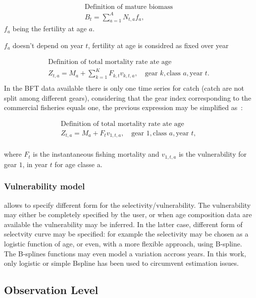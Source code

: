 \begin{gather}
\mbox{Definition of mature biomass}\\
B_t= \sum_{a=1}^A N_{t,a} f_a,
\end{gather} 
$f_a$ being the fertility at age $a$. 

$f_a$ doesn't depend  on year $t$, fertility at  age is considred
  as fixed over year

  
  
\begin{gather}
  \mbox{Definition of total mortality rate ate age}\\
  Z_{t,a}= M_a + \sum_{k=1}^K F_{k,t} v_{k, t,a}, \quad \mbox{gear }k,
  \mbox{class }a, \mbox{year }t.   \\
\end{gather} 
In  the  BFT  data  available  there is  only  one  time  series  for
 catch (catch are  not split among different  gears), considering that
 the gear index corresponding to the 
commercial fisheries equals one, the previous expression may be simplified as~:

\begin{gather}
  \mbox{Definition of total mortality rate ate age}\\
  Z_{t,a}= M_a + F_t v_{1, t,a}, \quad \mbox{gear } 1,
  \mbox{class }a, \mbox{year }t,   \\
\end{gather} 

where $F_t$ is the instantaneous  fishing mortality and $v_{1,t,a}$ is
the vulnerability for gear $1$, in year $t$ for age classe a.

\subsubsection{Vulnerability model}
\label{sec:vulnerability}
\iscam    allows     to    specify    different    form     for    the
selectivity/vulnerability. The vulnerability  may either be completely
specified by the user, or when  age composition data are available the
vulnerability may be  inferred. In the latter case,  different form of
selectvity curve may be specified:  for example the selectivity may be
chosen as a logistic function of age, or even, with a more flexible approach, using B-spline.  The B-splines
functions may  even model a  variation accross years. In  this work,
only logistic or simple Bspline has been used to circumvent estimation issues.


\subsection{Observation Level}

